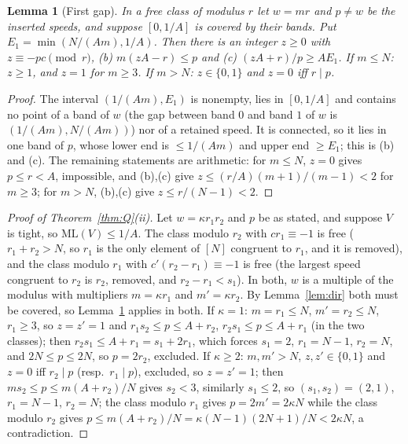 \documentclass[11pt]{article}
\newtheorem{lemma}[theorem]{Lemma}
\theoremstyle{definition}
\theoremstyle{remark}
\newcommand{\ML}{\mathrm{ML}}
\begin{document}
\begin{lemma}[First gap]\label{lem:gap}
In a free class of modulus $r$ let $w=mr$ and $p\ne w$ be the inserted speeds, and suppose $[0,1/A]$ is covered by their bands. Put $E_1=\min(N/(Am),1/A)$. Then there is an integer $z\ge0$ with $z\equiv-pc\pmod r$, (b) $m(zA-r)\le p$ and (c) $(zA+r)/p\ge AE_1$. If $m\le N$: $z\ge1$, and $z=1$ for $m\ge3$. If $m>N$: $z\in\{0,1\}$ and $z=0$ iff $r\mid p$.
\end{lemma}
\begin{proof}
The interval $(1/(Am),E_1)$ is nonempty, lies in $[0,1/A]$ and contains no point of a band of $w$ (the gap between band $0$ and band $1$ of $w$ is $(1/(Am),N/(Am))$) nor of a retained speed. It is connected, so it lies in one band of $p$, whose lower end is $\le1/(Am)$ and upper end $\ge E_1$; this is (b) and (c). The remaining statements are arithmetic: for $m\le N$, $z=0$ gives $p\le r<A$, impossible, and (b),(c) give $z\le(r/A)(m+1)/(m-1)<2$ for $m\ge3$; for $m>N$, (b),(c) give $z\le r/(N-1)<2$.
\end{proof}

\begin{proof}[Proof of Theorem~\ref{thm:Q}(ii)]
Let $w=\kappa r_1r_2$ and $p$ be as stated, and suppose $V$ is tight, so $\ML(V)\le1/A$. The class modulo $r_2$ with $cr_1\equiv-1$ is free ($r_1+r_2>N$, so $r_1$ is the only element of $[N]$ congruent to $r_1$, and it is removed), and the class modulo $r_1$ with $c'(r_2-r_1)\equiv-1$ is free (the largest speed congruent to $r_2$ is $r_2$, removed, and $r_2-r_1<s_1$). In both, $w$ is a multiple of the modulus with multipliers $m=\kappa r_1$ and $m'=\kappa r_2$. By Lemma~\ref{lem:dir} both must be covered, so Lemma~\ref{lem:gap} applies in both. If $\kappa=1$: $m=r_1\le N$, $m'=r_2\le N$, $r_1\ge3$, so $z=z'=1$ and $r_1s_2\le p\le A+r_2$, $r_2s_1\le p\le A+r_1$ (in the two classes); then $r_2s_1\le A+r_1=s_1+2r_1$, which forces $s_1=2$, $r_1=N-1$, $r_2=N$, and $2N\le p\le2N$, so $p=2r_2$, excluded. If $\kappa\ge2$: $m,m'>N$, $z,z'\in\{0,1\}$ and $z=0$ iff $r_2\mid p$ (resp.\ $r_1\mid p$), excluded, so $z=z'=1$; then $ms_2\le p\le m(A+r_2)/N$ gives $s_2<3$, similarly $s_1\le2$, so $(s_1,s_2)=(2,1)$, $r_1=N-1$, $r_2=N$; the class modulo $r_1$ gives $p=2m'=2\kappa N$ while the class modulo $r_2$ gives $p\le m(A+r_2)/N=\kappa(N-1)(2N+1)/N<2\kappa N$, a contradiction.
\end{proof}
\end{document}
